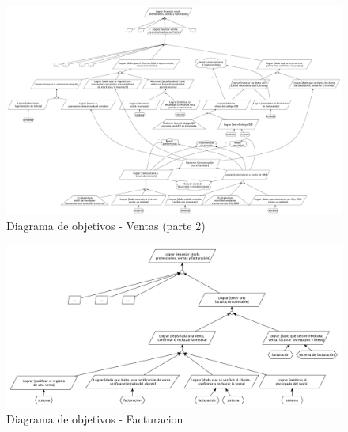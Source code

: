 \clearpage

\clearpage

\begin{figure}[h!]
  \centering
  \includegraphics[width=1.5\textwidth, angle=90]{./imagenes/ventas_2.pdf}
  \caption{Diagrama de objetivos - Ventas (parte 2)}
\end{figure}


\clearpage

\begin{figure}[h!]
  \centering
  \includegraphics[width=1\textwidth]{./imagenes/facturacion.pdf}
  \caption{Diagrama de objetivos - Facturacion}
\end{figure}

